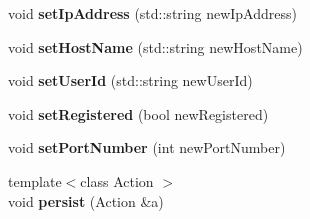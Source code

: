 \begin{DoxyCompactItemize}
\item 
void {\bfseries set\+Ip\+Address} (std\+::string new\+Ip\+Address)\hypertarget{classBridge_aa4fd7375d4b6092ca8bbee093dcc1a27}{}\label{classBridge_aa4fd7375d4b6092ca8bbee093dcc1a27}

\item 
void {\bfseries set\+Host\+Name} (std\+::string new\+Host\+Name)\hypertarget{classBridge_a1a5adca21bbdcdfe78fdd1e2f925d8c2}{}\label{classBridge_a1a5adca21bbdcdfe78fdd1e2f925d8c2}

\item 
void {\bfseries set\+User\+Id} (std\+::string new\+User\+Id)\hypertarget{classBridge_a2a68458da56a25afbbe4a8a108eb2f01}{}\label{classBridge_a2a68458da56a25afbbe4a8a108eb2f01}

\item 
void {\bfseries set\+Registered} (bool new\+Registered)\hypertarget{classBridge_ac912eac357647d47bc87052da93c45e9}{}\label{classBridge_ac912eac357647d47bc87052da93c45e9}

\item 
void {\bfseries set\+Port\+Number} (int new\+Port\+Number)\hypertarget{classBridge_a0acefccf95c0bf57465241ffe9618491}{}\label{classBridge_a0acefccf95c0bf57465241ffe9618491}

\item 
{\footnotesize template$<$class Action $>$ }\\void {\bfseries persist} (Action \&a)\hypertarget{classBridge_a20b4d278bc879a5c647e106e03fa1cdc}{}\label{classBridge_a20b4d278bc879a5c647e106e03fa1cdc}

\end{DoxyCompactItemize}
